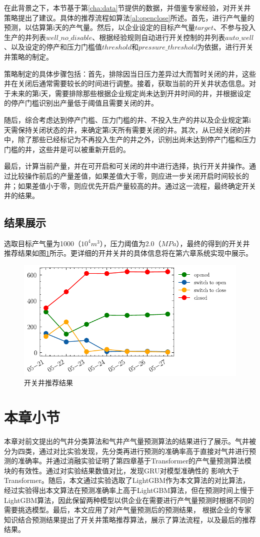 在此背景之下，本节基于第\ref{cha:data}节提供的数据，并借鉴专家经验，对开关井策略提出了建议。具体的推荐流程如算法\ref{al:openclose}所述。首先，进行产气量的预测，以估算第i天的产气量。然后，以企业设定的目标产气量$target$、不参与投入生产的井列表$well\_no\_disable$、根据经验规则自动进行开关控制的井列表$auto\_well$、以及设定的停产和压力门槛值$threshold$和$pressure\_threshold$为依据，进行开关井策略的制定。

策略制定的具体步骤包括：首先，排除因当日压力差异过大而暂时关闭的井，这些井在关闭后通常需要较长的时间进行调整。接着，获取当前的开关井状态信息。对于未来的第i天，需要排除那些根据企业规定尚未达到开井时间的井，并根据设定的停产门槛识别出产量低于阈值且需要关闭的井。

随后，综合考虑达到停产门槛、压力门槛的井、不投入生产的井以及企业规定第i天需保持关闭状态的井，来确定第i天所有需要关闭的井。其次，从已经关闭的井中，除了那些已经标记为不再投入生产的井之外，识别出尚未达到停产门槛和压力门槛的井，这些井是可以被重新开启的。

最后，计算当前产量，并在可开启和可关闭的井中进行选择，执行开关井操作。通过比较操作前后的产量差值，如果差值大于零，则应进一步关闭开启时间较长的井；如果差值小于零，则应优先开启产量较高的井。通过这一流程，最终确定开关井的结果。

\subsection{结果展示}
选取目标产气量为1000（$10^4m^3$），压力阈值为2.0（$MPa$），最终的得到的开关井推荐结果如图\ref{fig:openclosereco}所示。更详细的开井关井的具体信息将在第六章系统实现中展示。
\begin{figure}[H]
    \centering
    \includegraphics[width=.8\linewidth]{figure/reco.pdf}
    \caption{开关井推荐结果}
    \label{fig:openclosereco}
\end{figure}

  \section{本章小节}
  本章对前文提出的气井分类算法和气井产气量预测算法的结果进行了展示。气井被分为四类，通过对比实验发现，先分类再进行预测的准确率高于直接对气井进行预测的准确率。并通过消融实验证明了第四章基于Transformer的产气量预测算法模块的有效性。通过对实验结果数值对比，发现GRU对模型准确性的
  影响大于Transformer。随后，本文通过实验选取了LightGBM作为本文算法的对比算法，经过实验得出本文算法在预测准确率上高于LightGBM算法，但在预测时间上慢于LightGBM算法，因此保留两种模型以供企业在需要进行产气量预测时根据不同的需要挑选模型。最后，本文应用了对产气量预测后的预测结果，
  根据企业的专家知识结合预测结果提出了开关井策略推荐算法，展示了算法流程，以及最后的推荐结果。